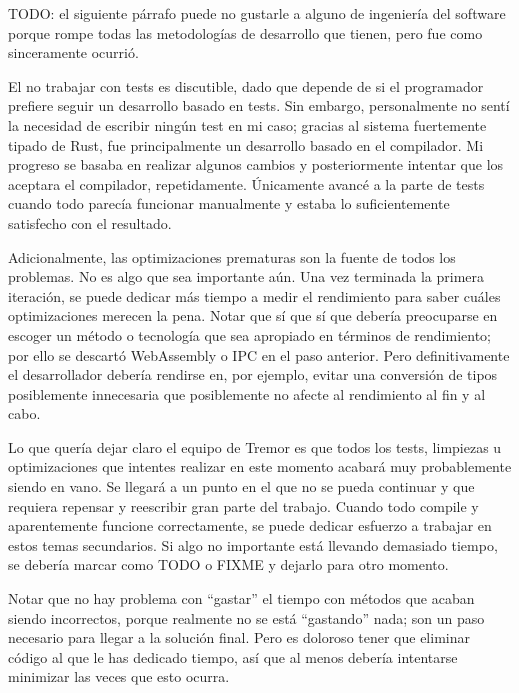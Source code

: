 TODO: el siguiente párrafo puede no gustarle a alguno de ingeniería del software
porque rompe todas las metodologías de desarrollo que tienen, pero fue como
sinceramente ocurrió.

El no trabajar con tests es discutible, dado que depende de si el programador
prefiere seguir un desarrollo basado en tests. Sin embargo, personalmente no
sentí la necesidad de escribir ningún test en mi caso; gracias al sistema
fuertemente tipado de Rust, fue principalmente un desarrollo basado en el
compilador. Mi progreso se basaba en realizar algunos cambios y posteriormente
intentar que los aceptara el compilador, repetidamente. Únicamente avancé a la
parte de tests cuando todo parecía funcionar manualmente y estaba lo
suficientemente satisfecho con el resultado.

Adicionalmente, las optimizaciones prematuras son la fuente de todos los
problemas. No es algo que sea importante aún. Una vez terminada la primera
iteración, se puede dedicar más tiempo a medir el rendimiento para saber cuáles
optimizaciones merecen la pena. Notar que sí que sí que debería preocuparse en
escoger un método o tecnología que sea apropiado en términos de rendimiento; por
ello se descartó WebAssembly o IPC en el paso anterior. Pero definitivamente el
desarrollador debería rendirse en, por ejemplo, evitar una conversión de tipos
posiblemente innecesaria que posiblemente no afecte al rendimiento al fin y al
cabo.

Lo que quería dejar claro el equipo de Tremor es que todos los tests, limpiezas
u optimizaciones que intentes realizar en este momento acabará muy probablemente
siendo en vano. Se llegará a un punto en el que no se pueda continuar y que
requiera repensar y reescribir gran parte del trabajo. Cuando todo compile y
aparentemente funcione correctamente, se puede dedicar esfuerzo a trabajar en
estos temas secundarios. Si algo no importante está llevando demasiado tiempo,
se debería marcar como TODO o FIXME y dejarlo para otro momento.

Notar que no hay problema con ``gastar'' el tiempo con métodos que acaban siendo
incorrectos, porque realmente no se está ``gastando'' nada; son un paso
necesario para llegar a la solución final. Pero es doloroso tener que eliminar
código al que le has dedicado tiempo, así que al menos debería intentarse
minimizar las veces que esto ocurra.

\section{}

